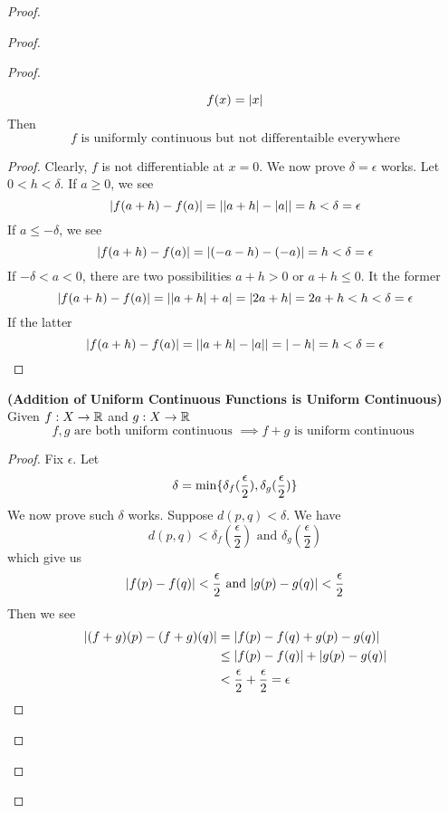 \documentclass{report}
\begin{document}
\begin{proof}
\begin{proof}
\begin{proof}
\begin{theorem}
\begin{equation*}
f(x)=|x|
\end{equation*}
Then 
\begin{equation*}
f\text{ is uniformly continuous but not differentaible everywhere}
\end{equation*}
\end{theorem}
\begin{proof}
Clearly, $f$ is not differentiable at $x=0$. We now prove $\delta=\epsilon $ works. Let $0<h<\delta$. If $a\geq 0$, we see 
\begin{equation*}
|f(a+h)-f(a)|=||a+h|-|a||=h<\delta=\epsilon 
\end{equation*}
If $a\leq -\delta$, we see 
\begin{equation*}
|f(a+h)-f(a)|=|(-a-h)-(-a)|=h<\delta=\epsilon 
\end{equation*}
If $-\delta<a<0$, there are two possibilities $a+h>0$ or  $a+h\leq 0$. It the former
\begin{equation*}
|f(a+h)-f(a)|=||a+h|+a|=|2a+h|=2a+h<h<\delta=\epsilon 
\end{equation*}
If the latter 
\begin{equation*}
|f(a+h)-f(a)|=||a+h|-|a||=|-h|=h<\delta=\epsilon 
\end{equation*}
\end{proof}
\begin{theorem}
\label{5.3.8}
\textbf{(Addition of Uniform Continuous Functions is Uniform Continuous)} Given $f:X\rightarrow \mathbb{R}$ and $g:X\rightarrow \mathbb{R}$
\begin{equation*}
f,g\text{ are both uniform continuous }\implies f+g\text{ is uniform continuous }
\end{equation*}
\end{theorem}
\begin{proof}
Fix $\epsilon $. Let 
\begin{equation*}
\delta= \min \{ \delta_f(\frac{\epsilon}{2}),\delta_g(\frac{\epsilon}{2}) \}
\end{equation*}
We now prove such $\delta$ works. Suppose $d(p,q)<\delta$. We have 
\begin{equation*}
d(p,q)<\delta_f(\frac{\epsilon}{2})\text{ and }\delta_g(\frac{\epsilon}{2})
\end{equation*}
which give us 
\begin{equation*}
|f(p)-f(q)|< \frac{\epsilon}{2}\text{ and }|g(p)-g(q)|<\frac{\epsilon}{2}
\end{equation*}
Then we see 
\begin{align*}
|(f+g)(p)-(f+g)(q)|&=|f(p)-f(q)+g(p)-g(q)|\\
&\leq |f(p)-f(q)|+|g(p)-g(q)|\\
&<\frac{\epsilon}{2}+\frac{\epsilon}{2}=\epsilon 
\end{align*}





\end{proof}
\end{proof}
\end{proof}
\end{proof}
\end{document}
